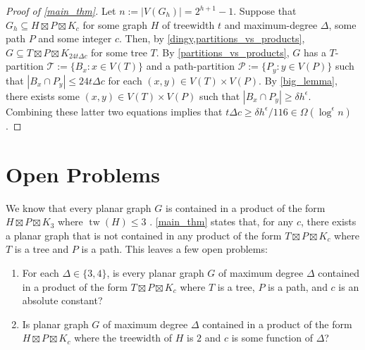 \documentclass{patmorin}
\DeclareMathOperator{\tw}{tw}
\renewcommand{\le}{\leqslant}
\renewcommand{\ge}{\geqslant}
\begin{document}
\begin{proof}[Proof of \cref{main_thm}]
  Let $n:=|V(G_h)|=2^{h+1}-1$.  Suppose that $G_h\subseteq H\boxtimes P\boxtimes K_c$ for some graph $H$ of treewidth $t$ and maximum-degree $\Delta$, some path $P$ and some integer $c$.  Then, by \cref{dingy,partitions_vs_products}, $G\subseteq T\boxtimes P\boxtimes K_{24t\Delta c}$ for some tree $T$.  By \cref{partitions_vs_products}, $G$ has a $T$-partition $\mathcal{T}:=\{B_x:x\in V(T)\}$ and a path-partition $\mathcal{P}:=\{P_y:y\in V(P)\}$ such that $|B_x\cap P_y|\le 24t\Delta c$ for each $(x,y)\in V(T)\times V(P)$.  By \cref{big_lemma}, there exists some $(x,y)\in V(T)\times V(P)$ such that $|B_x\cap P_y| \ge \delta h^\epsilon$.  Combining these latter two equations implies that $t\Delta c\ge \delta h^\epsilon/116 \in \Omega(\log^\epsilon n)$.  
\end{proof}



\section{Open Problems}

We know that every planar graph $G$ is contained in a product of the form $H\boxtimes P\boxtimes K_3$ where $\tw(H)\le 3$ \cite{dujmovic.joret.ea:planar}. \cref{main_thm} states that, for any $c$, there exists a planar graph that is not contained in any product of the form $T\boxtimes P\boxtimes K_c$ where $T$ is a tree and $P$ is a path.  This leaves a few open problems:

\begin{enumerate}
  \item For each $\Delta\in\{3,4\}$, is every planar graph $G$ of maximum degree $\Delta$ contained in a product of the form $T\boxtimes P\boxtimes K_c$ where $T$ is a tree, $P$ is a path, and $c$ is an absolute constant?

  \item Is planar graph $G$ of maximum degree $\Delta$ contained in a product of the form $H\boxtimes P\boxtimes K_c$ where the treewidth of $H$ is $2$ and $c$ is some function of $\Delta$?
\end{enumerate}




\end{document}
